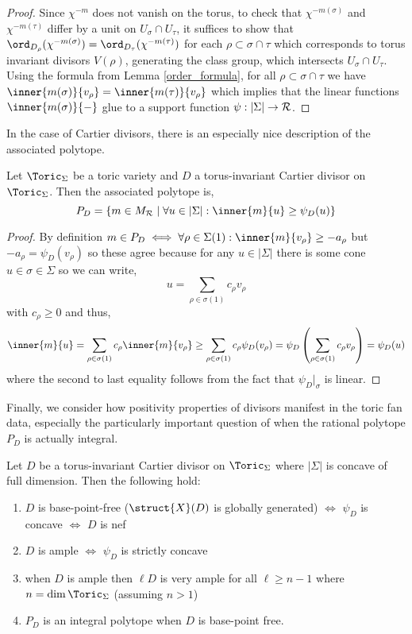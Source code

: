 \begin{proof}
Since $\chi^{-m}$ does not vanish on the torus, to check that $\chi^{-m(\sigma)}$ and $\chi^{-m(\tau)}$ differ by a unit on $U_\sigma \cap U_\tau$, it suffices to show that $\ord_{D_\rho}(\chi^{-m(\sigma)}) = \ord_{D_\tau}(\chi^{-m(\tau)})$ for each $\rho \subset \sigma \cap \tau$ which corresponds to torus invariant divisors $V(\rho)$, generating the class group, which intersects $U_\sigma \cap U_\tau$. Using the formula from Lemma \ref{order_formula}, for all $\rho \subset \sigma \cap \tau$ we have $\inner{m(\sigma)}{v_\rho} = \inner{m(\tau)}{v_\rho}$ which implies that the linear functions $\inner{m(\sigma)}{-}$ glue to a support function $\psi : |\Sigma| \to \mathcal{R}$. 
\end{proof}
\noindent
In the case of Cartier divisors, there is an especially nice description of the associated polytope.

\begin{prop}
Let $\Toric_\Sigma$ be a toric variety and $D$ a torus-invariant Cartier divisor on $\Toric_\Sigma$. Then the associated polytope is,
\[ P_D = \{ m \in M_\R \mid \forall u \in |\Sigma| : \inner{m}{u} \ge \psi_D(u) \} \]
\end{prop}

\begin{proof}
By definition $m \in P_D \iff \forall \rho \in \Sigma(1) : \inner{m}{v_\rho} \ge - a_\rho$ but $-a_\rho = \psi_D(v_\rho)$ so these agree because for any $u \in |\Sigma|$ there is some cone $u \in \sigma \in \Sigma$ so we can write,
\[ u = \sum_{\rho \in \sigma(1)} c_\rho v_\rho \]
with $c_\rho \ge 0$ and thus,
\[ \inner{m}{u} = \sum_{\rho \in \sigma(1)} c_\rho \inner{m}{v_\rho} \ge \sum_{\rho \in \sigma(1)} c_\rho \psi_D(v_\rho) = \psi_D \left( \sum_{\rho \in \sigma(1)} c_\rho v_\rho \right) = \psi_D(u) \]
where the second to last equality follows from the fact that $\psi_D |_\sigma$ is linear. 
\end{proof}
\noindent
Finally, we consider how positivity properties of divisors manifest in the toric fan data, especially the particularly important question of when the rational polytope $P_D$ is actually integral. 


\begin{theorem} \label{divisor_positivity}
Let $D$ be a torus-invariant Cartier divisor on $\Toric_\Sigma$ where $|\Sigma|$ is concave of full dimension. Then the following hold:
\begin{enumerate}
\item $D$ is base-point-free ($\struct{X}(D)$ is globally generated) $\iff$ $\psi_D$ is concave $\iff$ $D$ is nef
\item $D$ is ample $\iff$ $\psi_D$ is strictly concave 
\item when $D$ is ample then $\ell D$ is very ample for all $\ell \ge n - 1$ where $n = \dim{\Toric_\Sigma}$ (assuming $n > 1$)
\item $P_D$ is an integral polytope when $D$ is base-point free. 
\end{enumerate}
\end{theorem}

